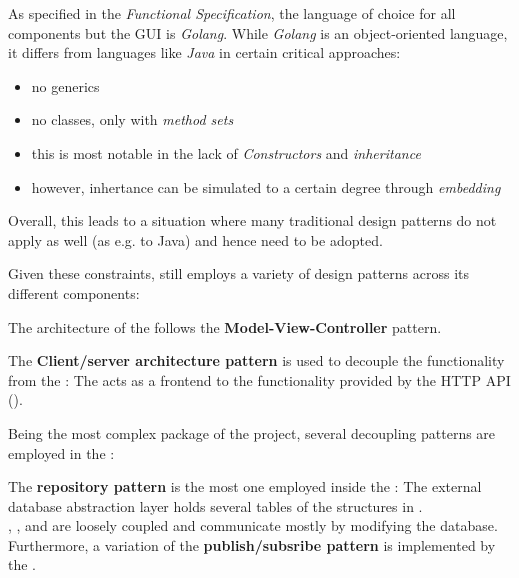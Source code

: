 As specified in the \emph{Functional Specification}, the language of choice for all components but the GUI is \emph{Golang}.
While \emph{Golang} is an object-oriented language, it differs from languages like \emph{Java} in certain critical approaches:
\begin{itemize}
  \item no generics
  \item no classes, only  with \emph{method sets}
  \item this is most notable in the lack of \emph{Constructors} and \emph{inheritance}
  \item however, inhertance can be simulated to a certain degree through \emph{embedding} %
\end{itemize}

Overall, this leads to a situation where many traditional design patterns do not apply as well (as e.g. to Java) and hence need
to be adopted.

Given these constraints, \mamid still employs a variety of design patterns across its different components:

The architecture of the  follows the \textbf{Model-View-Controller} pattern.

The \textbf{Client/server architecture pattern} is used to decouple the  functionality from the :
The  acts as a frontend to the functionality provided by the  HTTP API ().

Being the most complex package of the project, several decoupling patterns are employed in the :

The \textbf{repository pattern} is the most one employed inside the :
The external  database abstraction layer holds several tables of the structures in .\\
,  ,
 and   are loosely coupled and communicate mostly by
modifying the database.\\
Furthermore, a variation of the \textbf{publish/subsribe pattern} is implemented by the .

